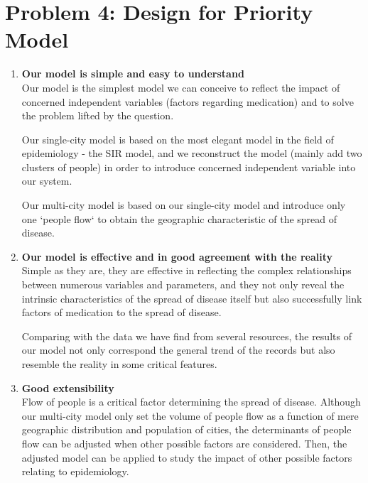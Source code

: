 \section{Problem 4: Design for Priority Model}
\begin{enumerate}
\item \textbf{Our model is simple and easy to understand} \\
Our model is the simplest model we can conceive to reflect the impact of concerned independent variables (factors regarding medication) and to solve the problem lifted by the question. 

Our single-city model is based on the most elegant model in the field of epidemiology - the SIR model, and we reconstruct the model (mainly add two clusters of people) in order to introduce concerned independent variable into our system. 

Our multi-city model is based on our single-city model and introduce only one `people flow` to obtain the geographic characteristic of the spread of disease.

\item \textbf{Our model is effective and in good agreement with the reality} \\
Simple as they are, they are effective in reflecting the complex relationships between numerous variables and parameters, and they not only reveal the intrinsic characteristics of the spread of disease itself but also successfully link factors of medication to the spread of disease.

Comparing with the data we have find from several resources, the results of our model not only correspond the general trend of the records but also resemble the reality in some critical features.

\item \textbf{Good extensibility} \\
Flow of people is a critical factor determining the spread of disease. Although our multi-city model only set the volume of people flow as a function of mere geographic distribution and population of cities, the determinants of people flow can be adjusted when other possible factors are considered. Then, the adjusted model can be applied to study the impact of other possible factors relating to epidemiology.

\end{enumerate}



